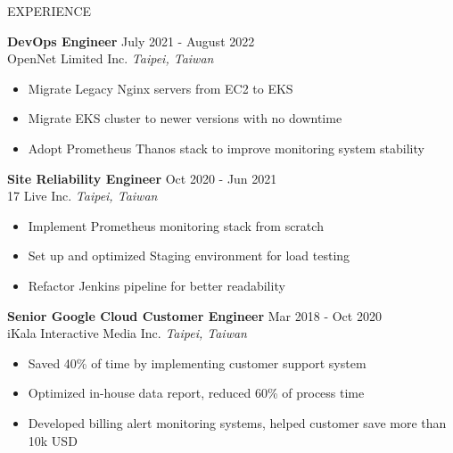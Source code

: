 \documentclass{resume} %
\begin{document}
\begin{rSection}{EXPERIENCE}

\textbf{DevOps Engineer} \hfill July 2021 - August 2022\\
OpenNet Limited Inc. \hfill \textit{Taipei, Taiwan}
 \begin{itemize}
    \itemsep -3pt {}
     \item Migrate Legacy Nginx servers from EC2 to EKS
     \item Migrate EKS cluster to newer versions with no downtime
     \item Adopt Prometheus Thanos stack to improve monitoring system stability
 \end{itemize}

\textbf{Site Reliability Engineer} \hfill Oct 2020 - Jun 2021\\
17 Live Inc. \hfill \textit{Taipei, Taiwan}
 \begin{itemize}
    \itemsep -3pt {}
     \item Implement Prometheus monitoring stack from scratch
     \item Set up and optimized Staging environment for load testing
     \item Refactor Jenkins pipeline for better readability
 \end{itemize}

 \textbf{Senior Google Cloud Customer Engineer} \hfill Mar 2018 - Oct 2020\\
iKala Interactive Media Inc. \hfill \textit{Taipei, Taiwan}
 \begin{itemize}
    \itemsep -3pt {}
     \item Saved 40\% of time by implementing customer support system
     \item Optimized in-house data report, reduced 60\% of process time
     \item Developed billing alert monitoring systems, helped customer save more than 10k USD
 \end{itemize}

\end{rSection}
\end{document}
